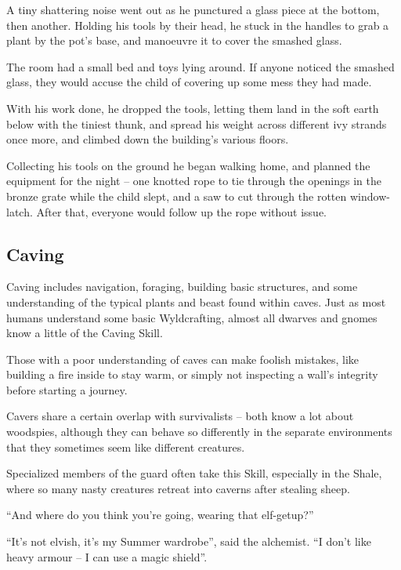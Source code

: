 \begin{multicols}{2}
\begin{exampletext}
  A tiny shattering noise went out as he punctured a glass piece at the bottom, then another.
  Holding his tools by their head, he stuck in the handles to grab a plant by the pot's base, and manoeuvre it to cover the smashed glass.

  The room had a small bed and toys lying around.
  If anyone noticed the smashed glass, they would accuse the child of covering up some mess they had made.

  With his work done, he dropped the tools, letting them land in the soft earth below with the tiniest thunk, and spread his weight across different ivy strands once more, and climbed down the building's various floors.

  Collecting his tools on the ground he began walking home, and planned the equipment for the night -- one knotted rope to tie through the openings in the bronze grate while the child slept, and a saw to cut through the rotten window-latch.
  After that, everyone would follow up the rope without issue.
\end{exampletext}


\subsection{Caving}

Caving includes navigation, foraging, building basic structures, and some understanding of the typical plants and beast found within caves.
Just as most humans understand some basic Wyldcrafting, almost all dwarves and gnomes know a little of the Caving Skill.

Those with a poor understanding of caves can make foolish mistakes, like building a fire inside to stay warm, or simply not inspecting a wall's integrity before starting a journey.

Cavers share a certain overlap with survivalists -- both know a lot about woodspies, although they can behave so differently in the separate environments that they sometimes seem like different creatures.

Specialized members of the \gls{guard} often take this Skill, especially in the Shale, where so many nasty creatures retreat into caverns after stealing sheep.

\begin{exampletext}

  ``And where do you think you're going, wearing that elf-getup?''

  ``It's not elvish, it's my Summer wardrobe'', said the alchemist.
  ``I don't like heavy armour -- I can use a magic shield''.


\end{exampletext}
\end{multicols}
